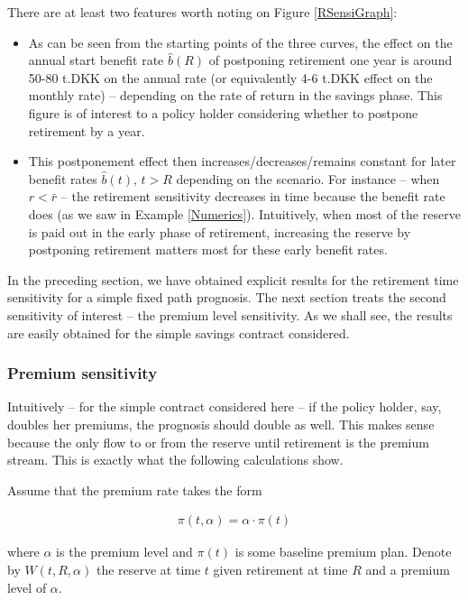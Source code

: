 \documentclass{article}
\newcommand{\1}[1]{\mathbbm{1}_{\left\lbrace #1 \right\rbrace}}
\theoremstyle{break}
\theoremstyle{remark}
\numberwithin{equation}{section}
\begin{document}
\begin{example}
There are at least two features worth noting on Figure \ref{RSensiGraph}:

\begin{itemize}
	\item As can be seen from the starting points of the three curves, the effect on the annual start benefit rate $\hat{b}(R)$ of postponing retirement one year is around 50-80 t.DKK on the annual rate (or equivalently 4-6 t.DKK effect on the monthly rate) -- depending on the rate of return in the savings phase. This figure is of interest to a policy holder considering whether to postpone retirement by a year.
	\item This postponement effect then increases/decreases/remains constant for later benefit rates $\hat{b}(t)$, $t>R$ depending on the scenario. For instance -- when $r < \bar{r}$ -- the retirement sensitivity decreases in time because the benefit rate does (as we saw in Example \ref{Numerics}). Intuitively, when most of the reserve is paid out in the early phase of retirement, increasing the reserve by postponing retirement matters most for these early benefit rates.
\end{itemize}
\end{example}

In the preceding section, we have obtained explicit results for the retirement time sensitivity for a simple fixed path prognosis. The next section treats the second sensitivity of interest -- the premium level sensitivity. As we shall see, the results are easily obtained for the simple savings contract considered.

\subsubsection{Premium sensitivity}

Intuitively -- for the simple contract considered here -- if the policy holder, say, doubles her premiums, the prognosis should double as well. This makes sense because the only flow to or from the reserve until retirement is the premium stream. This is exactly what the following calculations show.

Assume that the premium rate takes the form

\begin{align*}
	\pi (t,\alpha) = \alpha \cdot \pi(t)
\end{align*}

where $\alpha$ is the premium level and $\pi(t)$ is some baseline premium plan. Denote by $W(t,R,\alpha)$ the reserve at time $t$ given retirement at time $R$ and a premium level of $\alpha$.
\end{document}
